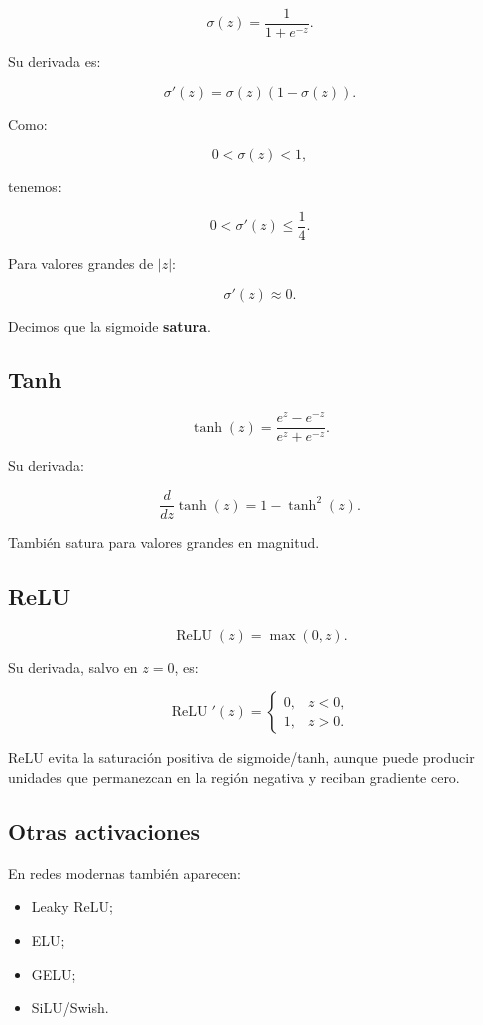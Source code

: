 \documentclass[
  letterpaper,
  DIV=11,
  numbers=noendperiod]{scrartcl}
\providecommand{\tightlist}{%
  \setlength{\itemsep}{0pt}\setlength{\parskip}{0pt}}
\begin{document}
\[
\sigma(z)
=
\frac{1}{1+e^{-z}}.
\]

Su derivada es:

\[
\boxed{
\sigma'(z)
=
\sigma(z)(1-\sigma(z)).
}
\]

Como:

\[
0<\sigma(z)<1,
\]

tenemos:

\[
0<\sigma'(z)\leq\frac14.
\]

Para valores grandes de \(|z|\):

\[
\sigma'(z)\approx0.
\]

Decimos que la sigmoide \textbf{satura}.

\subsection{Tanh}\label{tanh}

\[
\tanh(z)
=
\frac{e^z-e^{-z}}{e^z+e^{-z}}.
\]

Su derivada:

\[
\boxed{
\frac{d}{dz}\tanh(z)
=
1-\tanh^2(z).
}
\]

También satura para valores grandes en magnitud.

\subsection{ReLU}\label{relu}

\[
\operatorname{ReLU}(z)
=
\max(0,z).
\]

Su derivada, salvo en \(z=0\), es:

\[
\operatorname{ReLU}'(z)
=
\begin{cases}
0,&z<0,\\
1,&z>0.
\end{cases}
\]

ReLU evita la saturación positiva de sigmoide/tanh, aunque puede
producir unidades que permanezcan en la región negativa y reciban
gradiente cero.

\subsection{Otras activaciones}\label{otras-activaciones}

En redes modernas también aparecen:

\begin{itemize}
\tightlist
\item
  Leaky ReLU;
\item
  ELU;
\item
  GELU;
\item
  SiLU/Swish.
\end{itemize}
\end{document}

